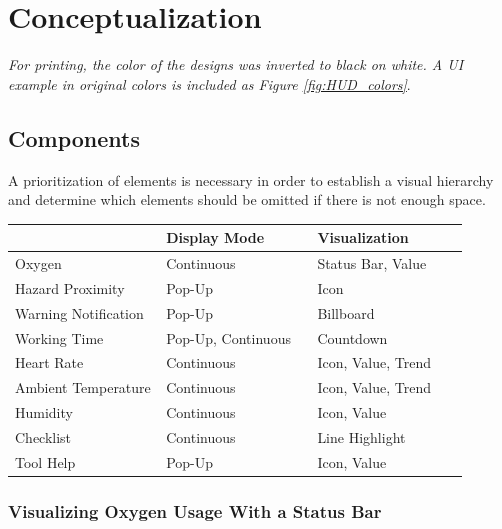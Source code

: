 \section{Conceptualization}
\label{sec:concept}

{\small\emph{For printing, the color of the designs was inverted to black on white. A UI example in original colors is included as Figure \ref{fig:HUD_colors}}.}

\subsection{Components}

A prioritization of elements is necessary in order to establish a visual hierarchy and determine which elements should be omitted if there is not enough space.

\begin{table}[hb]
    \centering
    \begin{tabular}{p{0.3\linewidth} p{0.3\linewidth} p{0.3\linewidth}}
        \toprule
        & Display Mode & Visualization \\
        \midrule
        Oxygen & Continuous & Status Bar, Value \\
        Hazard Proximity & Pop-Up & Icon \\
        Warning Notification & Pop-Up & Billboard \\
        Working Time & Pop-Up, Continuous & Countdown \\
        Heart Rate & Continuous & Icon, Value, Trend \\
        Ambient Temperature & Continuous & Icon, Value, Trend \\
        Humidity & Continuous &  Icon, Value \\
        Checklist & Continuous & Line Highlight \\
        Tool Help & Pop-Up & Icon, Value \\
        \bottomrule
    \end{tabular}
\end{table}

\subsubsection{Visualizing Oxygen Usage With a Status Bar}

